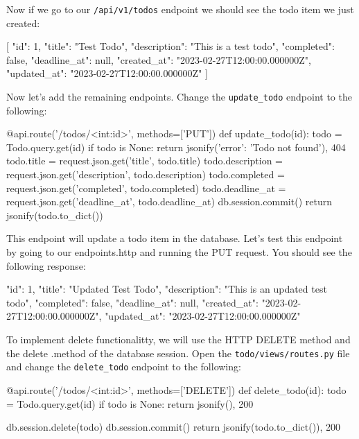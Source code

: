 \documentclass{csse4400}
\begin{document}
Now if we go to our \texttt{/api/v1/todos} endpoint we should see the todo item we just created:

\begin{code}[language=json,numbers=none]{}
  [
    {
      "id": 1,
      "title": "Test Todo",
      "description": "This is a test todo",
      "completed": false,
      "deadline_at": null,
      "created_at": "2023-02-27T12:00:00.000000Z",
      "updated_at": "2023-02-27T12:00:00.000000Z"
    }
  ]
\end{code}

Now let's add the remaining endpoints.
Change the \texttt{update\_todo} endpoint to the following:

\begin{code}[language=python,numbers=none]{}
  @api.route('/todos/<int:id>', methods=['PUT'])
  def update_todo(id):
      todo = Todo.query.get(id)
      if todo is None:
          return jsonify({'error': 'Todo not found'}), 404
      todo.title = request.json.get('title', todo.title)
      todo.description = request.json.get('description', todo.description)
      todo.completed = request.json.get('completed', todo.completed)
      todo.deadline_at = request.json.get('deadline_at', todo.deadline_at)
      db.session.commit()
      return jsonify(todo.to_dict())

\end{code}

This endpoint will update a todo item in the database.
Let's test this endpoint by going to our endpoints.http and running the PUT request.
You should see the following response:

\begin{code}[language=json,numbers=none]{}
  {
    "id": 1,
    "title": "Updated Test Todo",
    "description": "This is an updated test todo",
    "completed": false,
    "deadline_at": null,
    "created_at": "2023-02-27T12:00:00.000000Z",
    "updated_at": "2023-02-27T12:00:00.000000Z"
  }

\end{code}

To implement delete functionalitty, we will use the HTTP DELETE method and the delete .method of the database session.
Open the \texttt{todo/views/routes.py} file and change the \texttt{delete\_todo} endpoint to the following:

\begin{code}[language=python,numbers=none]{}
  @api.route('/todos/<int:id>', methods=['DELETE'])
  def delete_todo(id):
      todo = Todo.query.get(id)
      if todo is None:
          return jsonify({}), 200

      db.session.delete(todo)
      db.session.commit()
      return jsonify(todo.to_dict()), 200

\end{code}
\end{document}

